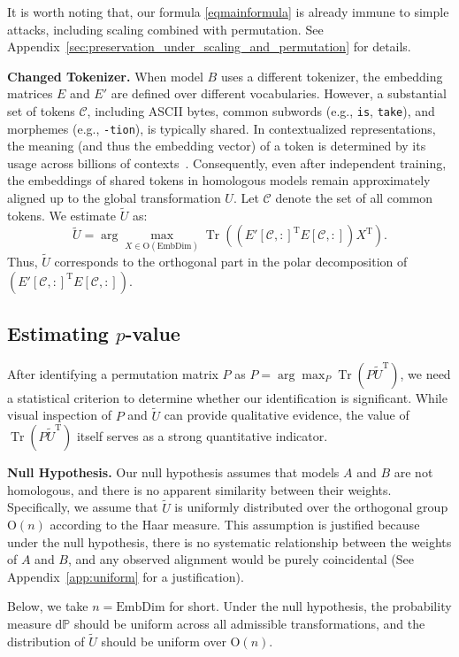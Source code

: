 \documentclass{article} %
\DeclareMathOperator{\Tr}{Tr}
\begin{document}
It is worth noting that,
our formula \ref{eqmainformula} is already immune to simple attacks, including scaling combined with permutation. See Appendix~\ref{sec:preservation_under_scaling_and_permutation} for details. 

\textbf{Changed Tokenizer.}
When model $B$ uses a different tokenizer, the embedding matrices $E$ and $E'$ are defined over different vocabularies. 
However, a substantial set of tokens $\mathcal{C}$, including ASCII bytes, common subwords (e.g., \texttt{is}, \texttt{take}), and morphemes (e.g., \texttt{-tion}), is typically shared. 
In contextualized representations, the meaning (and thus the embedding vector) of a token is determined by its usage across billions of contexts~\citep{mikolov2013distributed}. 
Consequently, even after independent training, the embeddings of shared tokens in homologous models remain approximately aligned up to the global transformation $U$. 
Let $\mathcal{C}$ denote the set of all common tokens. We estimate $\tilde{U}$ as:
\[
\tilde{U} = \arg\max_{X \in \mathrm{O}(\mathrm{EmbDim})} \Tr \left( \left(E'[\mathcal{C}, :]^{\text{T}} E[\mathcal{C}, :]\right) X^{\text{T}} \right).
\]
Thus, $\tilde{U}$ corresponds to the orthogonal part in the polar decomposition of $(E'[\mathcal{C}, :]^{\text{T}} E[\mathcal{C}, :])$.

\subsection{Estimating $p$-value}
After identifying a permutation matrix $P$ as $P = \arg\max_P\Tr(P \tilde{U}^{\text{T}})$,
we need a statistical criterion to determine whether our identification is significant.  
While visual inspection of $P$ and $\tilde{U}$ can provide qualitative evidence,  
the value of $\Tr(P \tilde{U}^{\text{T}})$ itself serves as a strong quantitative indicator.

\textbf{Null Hypothesis.} Our null hypothesis assumes that models $A$ and $B$ are not homologous,  
and there is no apparent similarity between their weights. Specifically, we assume that $\tilde{U}$ is uniformly distributed over the orthogonal group $\mathrm{O}(n)$ according to the Haar measure.  
This assumption is justified because under the null hypothesis, there is no systematic relationship between the weights of $A$ and $B$, and any observed alignment would be purely coincidental (See Appendix~\ref{app:uniform} for a justification).

Below, we take $n=\mathrm{EmbDim}$ for short. Under the null hypothesis, the probability measure $\mathrm{d}\mathbb{P}$ should be uniform across all admissible transformations,
and the distribution of $\tilde{U}$ should be uniform over $\mathrm{O}(n)$.
\end{document}
